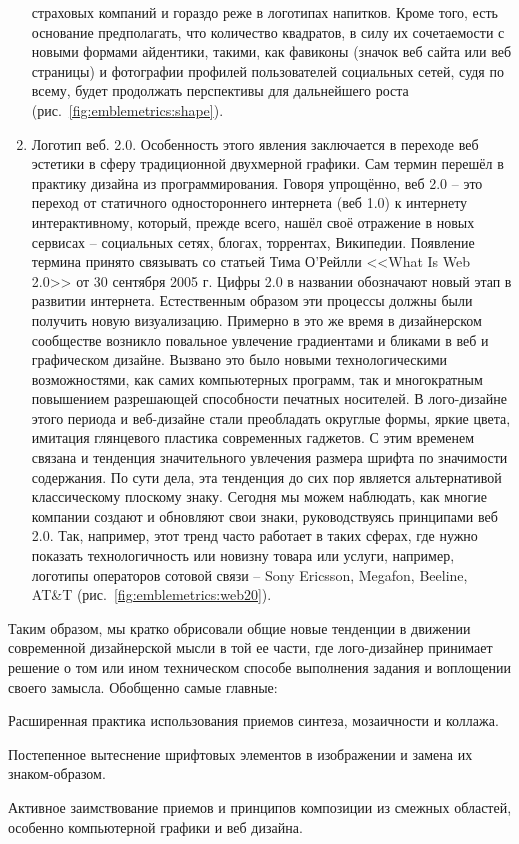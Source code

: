 \begin{enumerate}
  страховых компаний и гораздо реже в логотипах напитков. Кроме того, есть основание предполагать,
  что количество квадратов, в силу их сочетаемости  с новыми формами айдентики, такими, как фавиконы
  (значок веб сайта или веб страницы) и фотографии профилей пользователей социальных сетей, судя по
  всему, будет продолжать  перспективы  для дальнейшего роста (рис.~\ref{fig:emblemetrics:shape}).
\item Логотип веб. 2.0. Особенность этого явления  заключается в переходе веб эстетики в сферу
  традиционной двухмерной графики. Сам термин перешёл в практику дизайна из
  программирования. Говоря упрощённо, веб 2.0 -- это переход от статичного одностороннего интернета
  (веб 1.0) к интернету интерактивному, который, прежде всего, нашёл своё отражение в новых сервисах
  -- социальных сетях, блогах, торрентах, Википедии. Появление термина принято связывать со статьей
  Тима О'Рейлли <<What Is Web 2.0>> от 30 сентября 2005 г. Цифры 2.0 в названии обозначают новый
  этап в развитии интернета. Естественным образом эти процессы должны были получить новую
  визуализацию. Примерно в это же время в дизайнерском сообществе возникло повальное увлечение
  градиентами и бликами в веб и графическом дизайне. Вызвано это было новыми технологическими
  возможностями, как самих компьютерных программ, так и многократным повышением разрешающей
  способности печатных носителей. В лого-дизайне этого периода и веб-дизайне стали преобладать
  округлые формы, яркие цвета, имитация глянцевого пластика современных гаджетов. С этим временем
  связана и тенденция значительного увлечения размера шрифта по значимости содержания. По сути дела,
  эта тенденция до сих пор является альтернативой классическому плоскому знаку. Сегодня мы можем
  наблюдать, как многие компании создают и обновляют свои знаки, руководствуясь принципами веб
  2.0. Так, например, этот тренд часто работает в таких сферах, где нужно показать технологичность
  или новизну товара или услуги, например, логотипы операторов сотовой связи -- Sony Ericsson,
  Megafon, Beeline, AT\&T (рис.~\ref{fig:emblemetrics:web20}).
\end{enumerate}

Таким образом, мы кратко обрисовали общие новые тенденции в движении современной дизайнерской мысли
в той ее части, где лого-дизайнер принимает решение о том или ином техническом способе выполнения
задания и воплощении своего замысла. Обобщенно самые главные:
\begin{enumerate*}[label=\arabic*)]
\item Расширенная практика использования приемов синтеза, мозаичности и коллажа.
\item Постепенное вытеснение шрифтовых элементов в изображении и замена их знаком-образом.
\item Активное заимствование приемов и принципов композиции из смежных областей, особенно компьютерной графики и веб дизайна.
\end{enumerate*}

